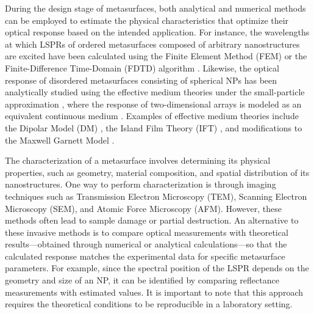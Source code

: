  During the design stage of metasurfaces, both analytical and numerical methods can be employed to estimate the physical characteristics that optimize their optical response based on the intended application. For instance, the wavelengths at which LSPRs of ordered metasurfaces composed of arbitrary nanostructures are excited have been calculated using the Finite Element Method (FEM) \cite{feuz_improving_2010} or the Finite-Difference Time-Domain (FDTD) algorithm \cite{qiu_differential_2015}. Likewise, the optical response of disordered metasurfaces consisting of spherical NPs has been analytically studied using the effective medium theories under the small-particle approximation \cite{reyes2022enhancement}, where the response of two-dimensional arrays is modeled as an equivalent continuous medium \cite{bosi_transmission_1992}. Examples of effective medium theories include the Dipolar Model (DM) \cite{barrera1991optical,reyes2022enhancement}, the Island Film Theory (IFT) \cite{bedeaux_optical_2004,svedendahl_fano_2012,svedendahl_refractometric_2014}, and modifications to the Maxwell Garnett Model \cite{kabashin_plasmonic_2009}.

The characterization of a metasurface involves determining its physical properties, such as geometry, material composition, and spatial distribution of its nanostructures. One way to perform characterization is through imaging techniques such as Transmission Electron Microscopy (TEM), Scanning Electron Microscopy (SEM), and Atomic Force Microscopy (AFM). However, these methods often lead to sample damage or partial destruction. An alternative to these invasive methods is to compare optical measurements with theoretical results—obtained through numerical or analytical calculations—so that the calculated response matches the experimental data for specific metasurface parameters. For example, since the spectral position of the LSPR depends on the geometry and size of an NP, it can be identified by comparing reflectance measurements with estimated values. It is important to note that this approach requires the theoretical conditions to be reproducible in a laboratory setting.

